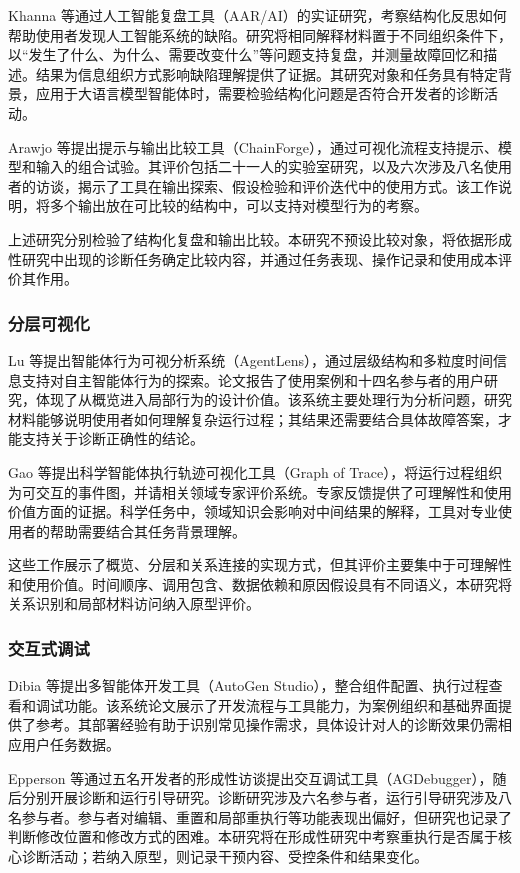 Khanna 等\cite{ref04}通过人工智能复盘工具（AAR/AI）的实证研究，考察结构化反思如何帮助使用者发现人工智能系统的缺陷。研究将相同解释材料置于不同组织条件下，以“发生了什么、为什么、需要改变什么”等问题支持复盘，并测量故障回忆和描述。结果为信息组织方式影响缺陷理解提供了证据。其研究对象和任务具有特定背景，应用于大语言模型智能体时，需要检验结构化问题是否符合开发者的诊断活动。

Arawjo 等\cite{arawjo2024chainforge}提出提示与输出比较工具（ChainForge），通过可视化流程支持提示、模型和输入的组合试验。其评价包括二十一人的实验室研究，以及六次涉及八名使用者的访谈，揭示了工具在输出探索、假设检验和评价迭代中的使用方式。该工作说明，将多个输出放在可比较的结构中，可以支持对模型行为的考察。

上述研究分别检验了结构化复盘和输出比较。本研究不预设比较对象，将依据形成性研究中出现的诊断任务确定比较内容，并通过任务表现、操作记录和使用成本评价其作用。

\subsubsection{分层可视化}

Lu 等\cite{ref22}提出智能体行为可视分析系统（AgentLens），通过层级结构和多粒度时间信息支持对自主智能体行为的探索。论文报告了使用案例和十四名参与者的用户研究，体现了从概览进入局部行为的设计价值。该系统主要处理行为分析问题，研究材料能够说明使用者如何理解复杂运行过程；其结果还需要结合具体故障答案，才能支持关于诊断正确性的结论。

Gao 等\cite{ref24}提出科学智能体执行轨迹可视化工具（Graph of Trace），将运行过程组织为可交互的事件图，并请相关领域专家评价系统。专家反馈提供了可理解性和使用价值方面的证据。科学任务中，领域知识会影响对中间结果的解释，工具对专业使用者的帮助需要结合其任务背景理解。

这些工作展示了概览、分层和关系连接的实现方式，但其评价主要集中于可理解性和使用价值。时间顺序、调用包含、数据依赖和原因假设具有不同语义，本研究将关系识别和局部材料访问纳入原型评价。

\subsubsection{交互式调试}

Dibia 等\cite{ref25}提出多智能体开发工具（AutoGen Studio），整合组件配置、执行过程查看和调试功能。该系统论文展示了开发流程与工具能力，为案例组织和基础界面提供了参考。其部署经验有助于识别常见操作需求，具体设计对人的诊断效果仍需相应用户任务数据。

Epperson 等\cite{ref02}通过五名开发者的形成性访谈提出交互调试工具（AGDebugger），随后分别开展诊断和运行引导研究。诊断研究涉及六名参与者，运行引导研究涉及八名参与者。参与者对编辑、重置和局部重执行等功能表现出偏好，但研究也记录了判断修改位置和修改方式的困难。本研究将在形成性研究中考察重执行是否属于核心诊断活动；若纳入原型，则记录干预内容、受控条件和结果变化。

